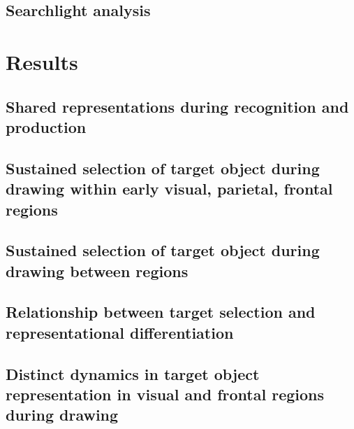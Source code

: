 \documentclass[11pt,letterpaper]{article}
\begin{document}
\subsection*{Searchlight analysis}

\section*{Results}

\subsection{Shared representations during recognition and production}

\subsection{Sustained selection of target object during drawing within early visual, parietal, frontal regions}

\subsection{Sustained selection of target object during drawing between regions}

\subsection{Relationship between target selection and representational differentiation}

\subsection{Distinct dynamics in target object representation in visual and frontal regions during drawing}

\end{document}
